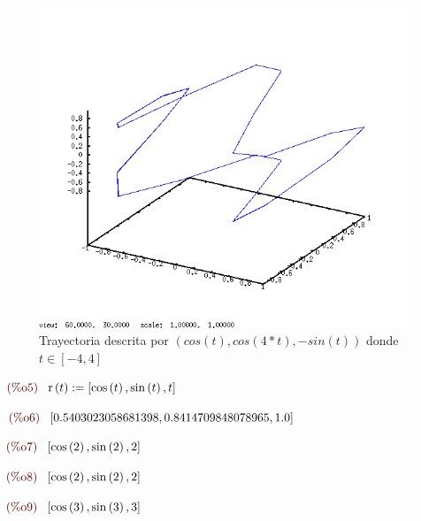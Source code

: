 \documentclass[12pt]{article}
\begin{document}
\begin{figure}[H]
\centering
\includegraphics[scale=0.5]{2.png}
\caption{Trayectoria descrita por $(cos(t),cos(4*t),-sin(t))$ donde $t\in[-4,4]$ }
\end{figure}

\begin{math}\displaystyle
\parbox{8ex}{\color{labelcolor}(\%o5) }
\mathrm{r}\left( t\right) :=[\mathrm{cos}\left( t\right) ,\mathrm{sin}\left( t\right) ,t]
\end{math}

\begin{math}\displaystyle
\parbox{8ex}{\color{labelcolor}(\%o6) }
[0.5403023058681398,0.8414709848078965,1.0]
\end{math}

\begin{math}\displaystyle
\parbox{8ex}{\color{labelcolor}(\%o7) }
[\mathrm{cos}\left( 2\right) ,\mathrm{sin}\left( 2\right) ,2]
\end{math}

\begin{math}\displaystyle
\parbox{8ex}{\color{labelcolor}(\%o8) }
[\mathrm{cos}\left( 2\right) ,\mathrm{sin}\left( 2\right) ,2]
\end{math}

\begin{math}\displaystyle
\parbox{8ex}{\color{labelcolor}(\%o9) }
[\mathrm{cos}\left( 3\right) ,\mathrm{sin}\left( 3\right) ,3]
\end{math}
\end{document}
